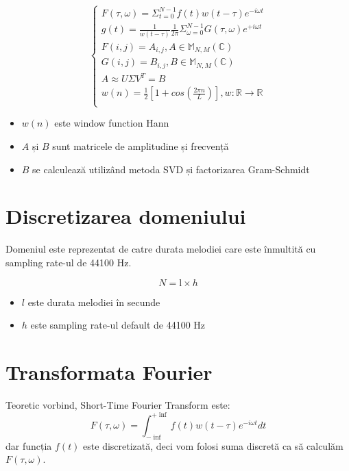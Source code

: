 \documentclass[english]{article}
\begin{document}
\begin{equation}
\begin{cases}
F(\tau,\omega) = \Sigma_{t=0}^{N-1} f(t) w(t-\tau) e^{-i\omega t} \\[6pt]
g(t) = \frac{1}{w(t-\tau)} \frac{1}{2\pi} \Sigma_{\omega=0}^{N-1} G(\tau,\omega) e^{+i\omega t} \\[6pt]
F(i,j) = A_{i,j} , A \in \mathbb{M}_{N,M} (\mathbb{C}) \\[6pt]
G(i,j) = B_{i,j} , B \in \mathbb{M}_{N,M} (\mathbb{C}) \\[6pt]
A \approx U\Sigma V^T = B \\[6pt]
w(n)=\frac{1}{2}[1+cos(\frac{2\pi n}{L})] , w:\mathbb{R} \rightarrow \mathbb{R} \\[6pt]
\end{cases}
\end{equation}

\begin{itemize}
	\item $w(n)$ este window function Hann
    \item $A$ și $B$ sunt matricele de amplitudine și frecvență
	\item $B$ se calculează utilizând metoda SVD și factorizarea Gram-Schmidt
\end{itemize}

\section{Discretizarea domeniului}\label{methods}

Domeniul este reprezentat de catre durata melodiei care este înmultită cu sampling rate-ul de 44100 Hz.

\begin{equation}
N = \text{l} \times h
\end{equation}

\begin{itemize}
	\item $l$ este durata melodiei în secunde
    \item $h$ este sampling rate-ul default de 44100 Hz
\end{itemize}

\section{Transformata Fourier}\label{Modelul}

Teoretic vorbind, Short-Time Fourier Transform este:
\begin{equation}
    F(\tau,\omega)=\int_{-\inf}^{+\inf}f(t)w(t-\tau)e^{-i\omega t}dt
\end{equation}
 dar funcția $f(t)$ este discretizată, deci vom folosi suma discretă ca să calculăm $F(\tau,\omega)$.
\end{document}
